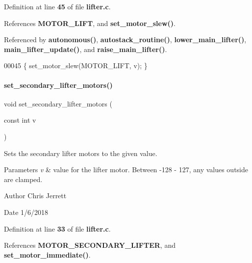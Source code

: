 Definition at line \textbf{ 45} of file \textbf{ lifter.\+c}.



References \textbf{ M\+O\+T\+O\+R\+\_\+\+L\+I\+FT}, and \textbf{ set\+\_\+motor\+\_\+slew()}.



Referenced by \textbf{ autonomous()}, \textbf{ autostack\+\_\+routine()}, \textbf{ lower\+\_\+main\+\_\+lifter()}, \textbf{ main\+\_\+lifter\+\_\+update()}, and \textbf{ raise\+\_\+main\+\_\+lifter()}.


\begin{DoxyCode}
00045 \{ set_motor_slew(MOTOR_LIFT, v); \}
\end{DoxyCode}
\mbox{\label{a00107_a78640d547d9361951a92d0bc00939536}} 
\paragraph{set\+\_\+secondary\+\_\+lifter\+\_\+motors()}
{\footnotesize\ttfamily void set\+\_\+secondary\+\_\+lifter\+\_\+motors (\begin{DoxyParamCaption}\item[{const int}]{v }\end{DoxyParamCaption})}



Sets the secondary lifter motors to the given value. 


\begin{DoxyParams}{Parameters}
{\em v} & value for the lifter motor. Between -\/128 -\/ 127, any values outside are clamped. \\
\hline
\end{DoxyParams}
\begin{DoxyAuthor}{Author}
Chris Jerrett 
\end{DoxyAuthor}
\begin{DoxyDate}{Date}
1/6/2018 
\end{DoxyDate}


Definition at line \textbf{ 33} of file \textbf{ lifter.\+c}.



References \textbf{ M\+O\+T\+O\+R\+\_\+\+S\+E\+C\+O\+N\+D\+A\+R\+Y\+\_\+\+L\+I\+F\+T\+ER}, and \textbf{ set\+\_\+motor\+\_\+immediate()}.



